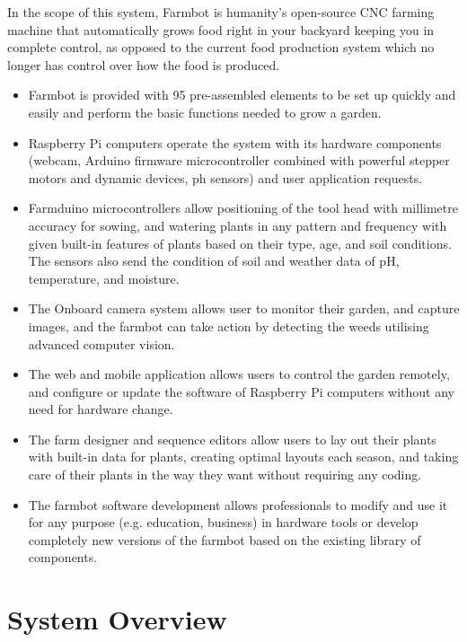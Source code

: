 In the scope of this system, Farmbot is humanity's open-source CNC farming machine that automatically grows food right in your backyard keeping you in complete control, as opposed to the current food production system which no longer has control over how the food is produced. 
\begin{itemize}
    \item Farmbot is provided with 95 pre-assembled elements to be set up quickly and easily and perform the basic functions needed to grow a garden.
    \item Raspberry Pi computers operate the system with its hardware components (webcam, Arduino firmware microcontroller combined with powerful stepper motors and dynamic devices, ph sensors) and user application requests.
    \item Farmduino microcontrollers allow positioning of the tool head with millimetre accuracy for sowing, and watering plants in any pattern and frequency with given built-in features of plants based on their type, age, and soil conditions. The sensors also send the condition of soil and weather data of pH, temperature, and moisture.
    \item The Onboard camera system allows user to monitor their garden, and capture images, and the farmbot can take action by detecting the weeds utilising advanced computer vision.
    \item The web and mobile application allows users to control the garden remotely, and configure or update the software of Raspberry Pi computers without any need for hardware change.
    \item The farm designer and sequence editors allow users to lay out their plants with built-in data for plants, creating optimal layouts each season, and taking care of their plants in the way they want without requiring any coding.
    \item The farmbot software development allows professionals to modify and use it for any purpose (e.g. education, business) in hardware tools or develop completely new versions of the farmbot based on the existing library of components.
    
\end{itemize}

\section{System Overview}

